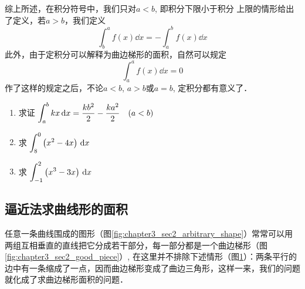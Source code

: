 综上所述，在积分符号中，我们只对$a<b$, 即积分下限小于积分
上限的情形给出了定义，若$a>b$，我们定义
\[\int^a_b f(x) \dd x=-\int^b_a f(x) \dd x\]
此外，由于定积分可以解释为曲边梯形的面积，自然可以规定
\[\int^a_a f(x) \dd x=0\]
作了这样的规定之后，不论$a<b$, $a>b$或$a=b$, 定积分都有意义了．


\begin{ex}
\begin{enumerate}
    \item 求证 $\displaystyle\int_{a}^{b} k x\,{\rm d} x=\dfrac{k b^{2}}{2}-\dfrac{k a^{2}}{2} \quad(a<b)$
    \item  求 $\displaystyle\int_{8}^{0}\left(x^{2}-4 x\right) \,{\rm d} x$
    \item  求 $\displaystyle\int_{-1}^{2}\left(x^{3}-3 x\right) \,{\rm d} x$
\end{enumerate}
\end{ex}

\subsection{逼近法求曲线形的面积}

任意一条曲线围成的图形（图\ref{fig:chapter3_sec2_arbitrary_shape}）常常可以用两组互相垂直的直线把它分成若干部分，每一部分都是一个曲边梯形（图\ref{fig:chapter3_sec2_good_piece}）, 在这里并不排除下述情形（图\ref{fig:chapter3_sec2_degenerated_piece}）：两条平行的边中有一条缩成了一点，因而曲边梯形变成了曲边三角形，这样一来，我们的问题就化成了求曲边梯形面积的问题．

\begin{figure}[htp]
    \centering
    \begin{minipage}[t]{0.45\textwidth}
        \centering
        \caption{}\label{fig:chapter3_sec2_arbitrary_shape}
        \end{minipage}
    \begin{minipage}[t]{0.25\textwidth}
    \centering
    \caption{}\label{fig:chapter3_sec2_good_piece}
    \end{minipage}
    \begin{minipage}[t]{0.25\textwidth}
    \centering
    \caption{}\label{fig:chapter3_sec2_degenerated_piece}
    \end{minipage}
  \end{figure}


